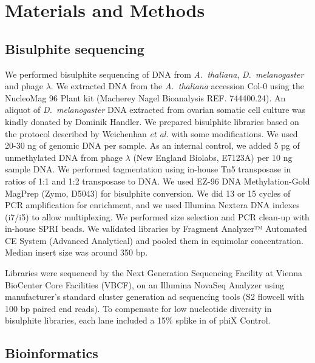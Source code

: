 \documentclass[10pt,draft,letterpaper]{article}
\begin{document}
\section*{Materials and Methods}

\subsection*{Bisulphite sequencing}

We performed bisulphite sequencing of DNA from \textit{A.~thaliana}, \emph{D.~melanogaster} and phage $\lambda$.
We extracted DNA from the \textit{A.~thaliana} accession Col-0 using the NucleoMag 96 Plant kit (Macherey Nagel Bioanalysis REF. 744400.24).
An aliquot of \textit{D.~melanogaster} DNA extracted from ovarian somatic cell culture \cite{niki2006establishment, saito2009regulatory} was kindly donated by Dominik Handler.
We prepared bisulphite libraries based on the protocol described by Weichenhan \textit{et al.} \cite{weichenhan2019generation} with some modifications.
We used 20-30 ng of genomic DNA per sample.
As an internal control, we added 5 pg of unmethylated DNA from phage $\lambda$ (New England Biolabs, E7123A) per 10 ng sample DNA.
We performed tagmentation using in-house Tn5 transposase \cite{picelli2014tn5} in ratios of 1:1 and 1:2 transposase to DNA.
We used EZ-96 DNA Methylation-Gold MagPrep (Zymo, D5043) for bisulphite conversion.
We did 13 or 15 cycles of PCR amplification for enrichment, and we used Illumina Nextera DNA indexes (i7/i5) to allow multiplexing.
We performed size selection and PCR clean-up with in-house SPRI beads.
We validated libraries by Fragment Analyzer™ Automated CE System (Advanced Analytical) and pooled them in equimolar concentration.
Median insert size was around 350 bp.

Libraries were sequenced by the Next Generation Sequencing Facility at Vienna BioCenter Core Facilities (VBCF), on an Illumina NovaSeq Analyzer using manufacturer’s standard cluster generation ad sequencing tools (S2 flowcell with 100 bp paired end reads).
To compensate for low nucleotide diversity in bisulphite libraries, each lane included a 15\% splike in of phiX Control.

\subsection*{Bioinformatics}
\end{document}
